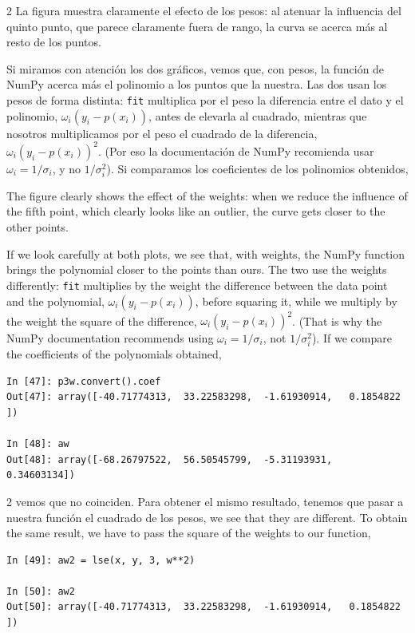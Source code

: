 \begin{paracol}{2}
La figura muestra claramente el efecto de los pesos: al atenuar la influencia del quinto punto, que parece claramente fuera de rango, la curva se acerca más al resto de los puntos.

Si miramos con atención los dos gráficos, vemos que, con pesos, la función de NumPy acerca más el polinomio a los puntos que la nuestra. Las dos usan los pesos de forma distinta: \texttt{fit} multiplica por el peso la diferencia entre el dato y el polinomio, $\omega_i (y_i - p(x_i))$, antes de elevarla al cuadrado, mientras que nosotros multiplicamos por el peso el cuadrado de la diferencia, $\omega_i(y_i-p(x_i))^2$. (Por eso la documentación de NumPy recomienda usar $\omega_i=1/\sigma_i$, y no $1/\sigma_i^2$). Si comparamos los coeficientes de los polinomios obtenidos,

\switchcolumn
The figure clearly shows the effect of the weights: when we reduce the influence of the fifth point, which clearly looks like an outlier, the curve gets closer to the other points.

If we look carefully at both plots, we see that, with weights, the NumPy function brings the polynomial closer to the points than ours. The two use the weights differently: \texttt{fit} multiplies by the weight the difference between the data point and the polynomial, $\omega_i (y_i - p(x_i))$, before squaring it, while we multiply by the weight the square of the difference, $\omega_i(y_i-p(x_i))^2$. (That is why the NumPy documentation recommends using $\omega_i=1/\sigma_i$, not $1/\sigma_i^2$). If we compare the coefficients of the polynomials obtained,
\end{paracol}

\begin{verbatim}
In [47]: p3w.convert().coef
Out[47]: array([-40.71774313,  33.22583298,  -1.61930914,   0.1854822 ])

In [48]: aw
Out[48]: array([-68.26797522,  56.50545799,  -5.31193931,   0.34603134])
\end{verbatim}

\begin{paracol}{2}
vemos que no coinciden. Para obtener el mismo resultado, tenemos que pasar a nuestra función el cuadrado de los pesos,
\switchcolumn
we see that they are different. To obtain the same result, we have to pass the square of the weights to our function,
\end{paracol}
\begin{verbatim}
In [49]: aw2 = lse(x, y, 3, w**2)

In [50]: aw2
Out[50]: array([-40.71774313,  33.22583298,  -1.61930914,   0.1854822 ])
\end{verbatim}

